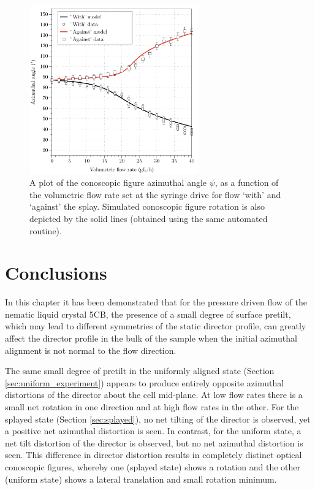 \begin{figure}
\begin{center}
\includegraphics[width=0.65\textwidth]{Figures/90/with_against_data_plot.pdf}
\end{center}
\caption[A plot of experimental conoscopic figure rotation as a function of flow rate for flow `with' and `against' the splay]{\label{fig:with_against_data_plot}A plot of the conoscopic figure azimuthal angle $\psi$, as a function of the volumetric flow rate set at the syringe drive for flow `with' and `against' the splay. Simulated conoscopic figure rotation is also depicted by the solid lines (obtained using the same automated routine).}
\end{figure}

\section{Conclusions}
In this chapter it has been demonstrated that for the pressure driven flow of the nematic liquid crystal 5CB, the presence of a small degree of surface pretilt, which may lead to different symmetries of the static director profile, can greatly affect the director profile in the bulk of the sample when the initial azimuthal alignment is not normal to the flow direction.

The same small degree of pretilt in the uniformly aligned state (Section \ref{sec:uniform_experiment}) appears to produce entirely opposite azimuthal distortions of the director about the cell mid-plane. At low flow rates there is a small net rotation in one direction and at high flow rates in the other. For the splayed state (Section \ref{sec:splayed}), no net tilting of the director is observed, yet a positive net azimuthal distortion is seen. In contrast, for the uniform state, a net tilt distortion of the director is observed, but no net azimuthal distortion is seen. This difference in director distortion results in completely distinct optical conoscopic figures, whereby one (splayed state) shows a rotation and the other (uniform state) shows a lateral translation and small rotation minimum.

